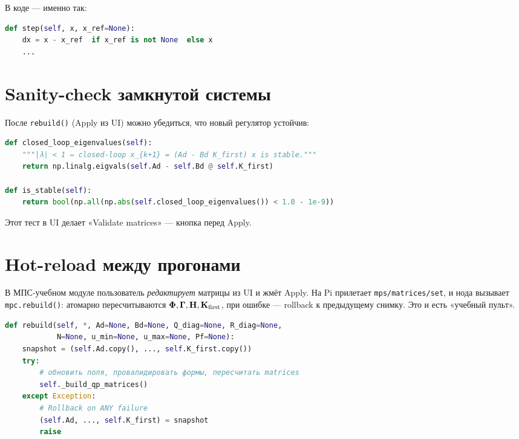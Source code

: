 В коде --- именно так:

\begin{codebox}[title={\filepath{mpc\_controller.py:288}}]
\begin{lstlisting}[language=Python]
def step(self, x, x_ref=None):
    dx = x - x_ref  if x_ref is not None  else x
    ...
\end{lstlisting}
\end{codebox}

\section{Sanity-check замкнутой системы}

После \texttt{rebuild()} (Apply из UI) можно убедиться, что новый
регулятор устойчив:

\begin{codebox}[title={\filepath{mpc\_controller.py:332}}]
\begin{lstlisting}[language=Python]
def closed_loop_eigenvalues(self):
    """|λ| < 1 ⇔ closed-loop x_{k+1} = (Ad - Bd K_first) x is stable."""
    return np.linalg.eigvals(self.Ad - self.Bd @ self.K_first)

def is_stable(self):
    return bool(np.all(np.abs(self.closed_loop_eigenvalues()) < 1.0 - 1e-9))
\end{lstlisting}
\end{codebox}

Этот тест в UI делает «Validate matrices» --- кнопка перед Apply.

\section{Hot-reload между прогонами}

В МПС-учебном модуле пользователь \emph{редактирует} матрицы из UI и
жмёт Apply. На Pi прилетает \texttt{mps/matrices/set}, и нода вызывает
\texttt{mpc.rebuild()}: атомарно пересчитываются $\mathbf{\Phi}, \mathbf{\Gamma},
\mathbf{H}, \mathbf{K}_\text{first}$, при ошибке --- rollback к предыдущему
снимку. Это и есть «учебный пульт».

\begin{codebox}[title={\filepath{mpc\_controller.py:172}, фрагмент rebuild}]
\begin{lstlisting}[language=Python]
def rebuild(self, *, Ad=None, Bd=None, Q_diag=None, R_diag=None,
            N=None, u_min=None, u_max=None, Pf=None):
    snapshot = (self.Ad.copy(), ..., self.K_first.copy())
    try:
        # обновить поля, провалидировать формы, пересчитать matrices
        self._build_qp_matrices()
    except Exception:
        # Rollback on ANY failure
        (self.Ad, ..., self.K_first) = snapshot
        raise
\end{lstlisting}
\end{codebox}

